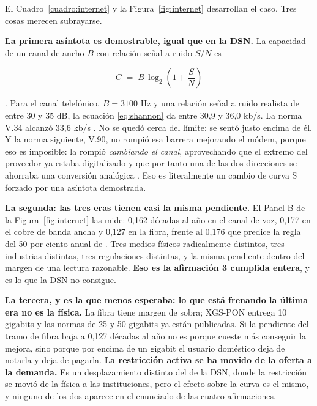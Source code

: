\documentclass[11pt,letterpaper]{article}
\begin{document}
El Cuadro~\ref{cuadro:internet} y la Figura~\ref{fig:internet} desarrollan el
caso. Tres cosas merecen subrayarse.

\textbf{La primera asíntota es demostrable, igual que en la DSN.} La capacidad
de un canal de ancho $B$ con relación señal a ruido $S/N$ es

\begin{equation}
C \;=\; B \,\log_{2}\!\left(1 + \frac{S}{N}\right)
\label{eq:shannon}
\end{equation}

\parencite{shannon1948}. Para el canal telefónico, $B = 3100$ Hz y una
relación señal a ruido realista de entre 30 y 35 dB, la ecuación
\eqref{eq:shannon} da entre 30,9 y 36,0 kb/s. La norma V.34 alcanzó 33,6 kb/s
\parencite{ituv34}. No se quedó cerca del
límite: se sentó justo encima de él. Y la norma siguiente, V.90, no rompió esa
barrera mejorando el módem, porque eso es imposible: la rompió
\emph{cambiando el canal}, aprovechando que el extremo del proveedor ya estaba
digitalizado y que por tanto una de las dos direcciones se ahorraba una
conversión analógica \parencite{ituv90}. Eso es literalmente un cambio de
curva S forzado por una asíntota demostrada.

\textbf{La segunda: las tres eras tienen casi la misma pendiente.} El Panel B
de la Figura~\ref{fig:internet} las mide: 0,162 décadas al año en el canal de
voz, 0,177 en el cobre de banda ancha y 0,127 en la fibra, frente al 0,176 que
predice la regla del 50 por ciento anual de \textcite{nielsen2019}. Tres
medios físicos radicalmente distintos, tres industrias distintas, tres
regulaciones distintas, y la misma pendiente dentro del margen de una lectura
razonable. \textbf{Eso es la afirmación 3 cumplida entera}, y es lo que la DSN
no consigue.

\textbf{La tercera, y es la que menos esperaba: lo que está frenando la última
era no es la física.} La fibra tiene margen de sobra; XGS-PON entrega 10
gigabits y las normas de 25 y 50 gigabits ya están publicadas. Si la pendiente
del tramo de fibra baja a 0,127 décadas al año no es porque cueste más
conseguir la mejora, sino porque por encima de un gigabit el usuario doméstico
deja de notarla y deja de pagarla. \textbf{La restricción activa se ha movido
de la oferta a la demanda.} Es un desplazamiento distinto del de la DSN, donde
la restricción se movió de la física a las instituciones, pero el efecto sobre
la curva es el mismo, y ninguno de los dos aparece en el enunciado de las
cuatro afirmaciones.
\end{document}
